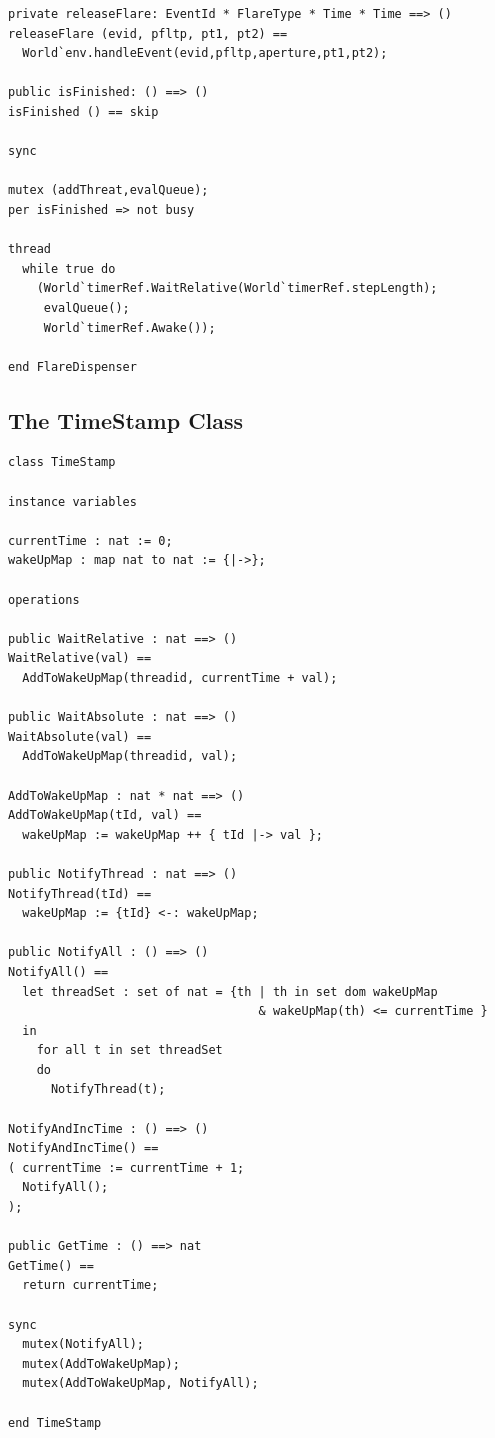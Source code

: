 \documentclass{overturerepchap}
\begin{document}
\begin{lstlisting}
private releaseFlare: EventId * FlareType * Time * Time ==> ()
releaseFlare (evid, pfltp, pt1, pt2) == 
  World`env.handleEvent(evid,pfltp,aperture,pt1,pt2);

public isFinished: () ==> ()
isFinished () == skip

sync

mutex (addThreat,evalQueue);
per isFinished => not busy

thread
  while true do
    (World`timerRef.WaitRelative(World`timerRef.stepLength);
     evalQueue();
     World`timerRef.Awake());
     
end FlareDispenser
\end{lstlisting}


\subsection{The TimeStamp Class}

\begin{lstlisting}
class TimeStamp

instance variables
  
currentTime : nat := 0;
wakeUpMap : map nat to nat := {|->};

operations

public WaitRelative : nat ==> ()
WaitRelative(val) ==
  AddToWakeUpMap(threadid, currentTime + val);

public WaitAbsolute : nat ==> ()
WaitAbsolute(val) ==
  AddToWakeUpMap(threadid, val);

AddToWakeUpMap : nat * nat ==> ()
AddToWakeUpMap(tId, val) ==
  wakeUpMap := wakeUpMap ++ { tId |-> val };

public NotifyThread : nat ==> ()
NotifyThread(tId) ==
  wakeUpMap := {tId} <-: wakeUpMap;

public NotifyAll : () ==> ()
NotifyAll() ==
  let threadSet : set of nat = {th | th in set dom wakeUpMap 
                                   & wakeUpMap(th) <= currentTime }
  in
    for all t in set threadSet 
    do
      NotifyThread(t);

NotifyAndIncTime : () ==> ()
NotifyAndIncTime() ==
( currentTime := currentTime + 1;
  NotifyAll();
);

public GetTime : () ==> nat
GetTime() ==
  return currentTime;

sync
  mutex(NotifyAll);
  mutex(AddToWakeUpMap);
  mutex(AddToWakeUpMap, NotifyAll); 

end TimeStamp
\end{lstlisting}
\end{document}
